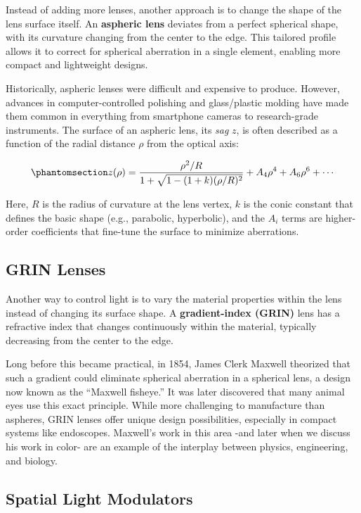 \documentclass[
  letterpaper,
]{book}
\begin{document}
Instead of adding more lenses, another approach is to change the shape
of the lens surface itself. An \textbf{aspheric lens} deviates from a
perfect spherical shape, with its curvature changing from the center to
the edge. This tailored profile allows it to correct for spherical
aberration in a single element, enabling more compact and lightweight
designs.

Historically, aspheric lenses were difficult and expensive to produce.
However, advances in computer-controlled polishing and glass/plastic
molding have made them common in everything from smartphone cameras to
research-grade instruments. The surface of an aspheric lens, its
\emph{sag} \(z\), is often described as a function of the radial
distance \(\rho\) from the optical axis:

\begin{equation}\phantomsection\label{eq-aspheric}{
z(\rho) = \frac{\rho^2 / R}{1 + \sqrt{1 - (1 + k)(\rho/R)^2}} + A_4 \rho^4 + A_6 \rho^6 + \cdots
}\end{equation}

Here, \(R\) is the radius of curvature at the lens vertex, \(k\) is the
conic constant that defines the basic shape (e.g., parabolic,
hyperbolic), and the \(A_i\) terms are higher-order coefficients that
fine-tune the surface to minimize aberrations.

\subsection{GRIN Lenses}\label{grin-lenses}

Another way to control light is to vary the material properties within
the lens instead of changing its surface shape. A \textbf{gradient-index
(GRIN)} lens has a refractive index that changes continuously within the
material, typically decreasing from the center to the edge.

Long before this became practical, in 1854, James Clerk Maxwell
theorized that such a gradient could eliminate spherical aberration in a
spherical lens, a design now known as the ``Maxwell fisheye.'' It was
later discovered that many animal eyes use this exact principle. While
more challenging to manufacture than aspheres, GRIN lenses offer unique
design possibilities, especially in compact systems like endoscopes.
Maxwell's work in this area -and later when we discuss his work in
color- are an example of the interplay between physics, engineering, and
biology.

\subsection{Spatial Light Modulators}\label{spatial-light-modulators}
\end{document}
